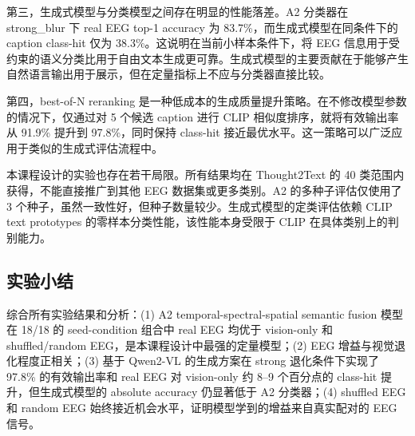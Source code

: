 第三，生成式模型与分类模型之间存在明显的性能落差。A2 分类器在 strong\_blur 下 real EEG top-1 accuracy 为 83.7\%，而生成式模型在同条件下的 caption class-hit 仅为 38.3\%。这说明在当前小样本条件下，将 EEG 信息用于受约束的语义分类比用于自由文本生成更可靠。生成式模型的主要贡献在于能够产生自然语言输出用于展示，但在定量指标上不应与分类器直接比较。

第四，best-of-N reranking 是一种低成本的生成质量提升策略。在不修改模型参数的情况下，仅通过对 5 个候选 caption 进行 CLIP 相似度排序，就将有效输出率从 91.9\% 提升到 97.8\%，同时保持 class-hit 接近最优水平。这一策略可以广泛应用于类似的生成式评估流程中。

本课程设计的实验也存在若干局限。所有结果均在 Thought2Text 的 40 类范围内获得，不能直接推广到其他 EEG 数据集或更多类别。A2 的多种子评估仅使用了 3 个种子，虽然一致性好，但种子数量较少。生成式模型的定类评估依赖 CLIP text prototypes 的零样本分类性能，该性能本身受限于 CLIP 在具体类别上的判别能力。

\subsection{实验小结}

综合所有实验结果和分析：(1) A2 temporal-spectral-spatial semantic fusion 模型在 18/18 的 seed-condition 组合中 real EEG 均优于 vision-only 和 shuffled/random EEG，是本课程设计中最强的定量模型；(2) EEG 增益与视觉退化程度正相关；(3) 基于 Qwen2-VL 的生成方案在 strong 退化条件下实现了 97.8\% 的有效输出率和 real EEG 对 vision-only 约 8--9 个百分点的 class-hit 提升，但生成式模型的 absolute accuracy 仍显著低于 A2 分类器；(4) shuffled EEG 和 random EEG 始终接近机会水平，证明模型学到的增益来自真实配对的 EEG 信号。
